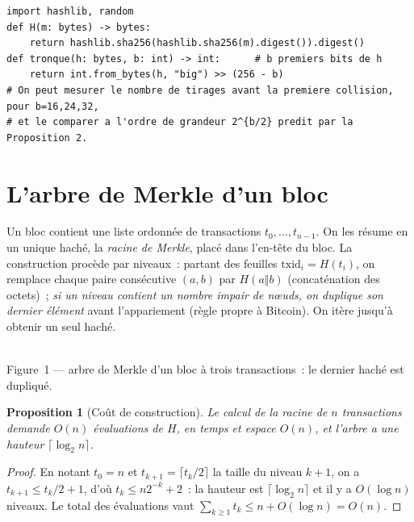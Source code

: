 \documentclass[11pt,a4paper]{article}
\theoremstyle{definition}\newtheorem{definition}{Définition}
\theoremstyle{plain}\newtheorem{theoreme}{Théorème}\newtheorem{proposition}{Proposition}
\theoremstyle{remark}\newtheorem{remarque}{Remarque}
\begin{document}
\begin{lstlisting}
import hashlib, random
def H(m: bytes) -> bytes:
    return hashlib.sha256(hashlib.sha256(m).digest()).digest()
def tronque(h: bytes, b: int) -> int:      # b premiers bits de h
    return int.from_bytes(h, "big") >> (256 - b)
# On peut mesurer le nombre de tirages avant la premiere collision, pour b=16,24,32,
# et le comparer a l'ordre de grandeur 2^{b/2} predit par la Proposition 2.
\end{lstlisting}

\section{L'arbre de Merkle d'un bloc}

Un bloc contient une liste ordonnée de transactions $t_0,\dots,t_{n-1}$. On les résume en un
unique haché, la \emph{racine de Merkle}, placé dans l'en-tête du bloc. La construction procède
par niveaux~: partant des feuilles $\mathrm{txid}_i=H(t_i)$, on remplace chaque paire consécutive
$(a,b)$ par $H(a\Vert b)$ (concaténation des octets)~; \emph{si un niveau contient un nombre impair
de n\oe uds, on duplique son dernier élément} avant l'appariement (règle propre à Bitcoin). On
itère jusqu'à obtenir un seul haché.

\begin{center}
\\[-1pt]
{\footnotesize Figure~1 --- arbre de Merkle d'un bloc à trois transactions~: le dernier haché est dupliqué.}
\end{center}

\begin{proposition}[Coût de construction]\label{prop:cout}
Le calcul de la racine de $n$ transactions demande $O(n)$ évaluations de $H$, en temps et espace
$O(n)$, et l'arbre a une hauteur $\lceil\log_2 n\rceil$.
\end{proposition}
\begin{proof}
En notant $t_0=n$ et $t_{k+1}=\lceil t_k/2\rceil$ la taille du niveau $k+1$, on a
$t_{k+1}\le t_k/2+1$, d'où $t_k\le n2^{-k}+2$~: la hauteur est $\lceil\log_2 n\rceil$ et il y a
$O(\log n)$ niveaux. Le total des évaluations vaut $\sum_{k\ge1} t_k\le n+O(\log n)=O(n)$.
\end{proof}
\end{document}
